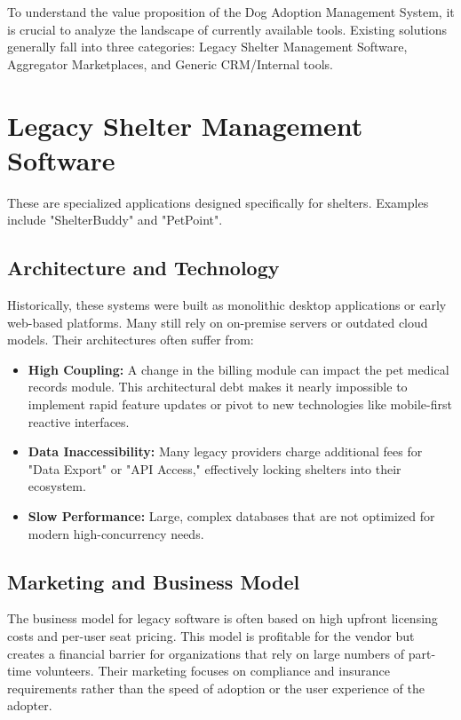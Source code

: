 To understand the value proposition of the Dog Adoption Management System, it is crucial to analyze the landscape of currently available tools. Existing solutions generally fall into three categories: Legacy Shelter Management Software, Aggregator Marketplaces, and Generic CRM/Internal tools.

\section{Legacy Shelter Management Software}

These are specialized applications designed specifically for shelters. Examples include "ShelterBuddy" and "PetPoint".

\subsection{Architecture and Technology}
Historically, these systems were built as monolithic desktop applications or early web-based platforms. Many still rely on on-premise servers or outdated cloud models. Their architectures often suffer from:
\begin{itemize}
    \item \textbf{High Coupling:} A change in the billing module can impact the pet medical records module. This architectural debt makes it nearly impossible to implement rapid feature updates or pivot to new technologies like mobile-first reactive interfaces.
    \item \textbf{Data Inaccessibility:} Many legacy providers charge additional fees for "Data Export" or "API Access," effectively locking shelters into their ecosystem.
    \item \textbf{Slow Performance:} Large, complex databases that are not optimized for modern high-concurrency needs.
\end{itemize}

\subsection{Marketing and Business Model}
The business model for legacy software is often based on high upfront licensing costs and per-user seat pricing. This model is profitable for the vendor but creates a financial barrier for organizations that rely on large numbers of part-time volunteers. Their marketing focuses on compliance and insurance requirements rather than the speed of adoption or the user experience of the adopter.

